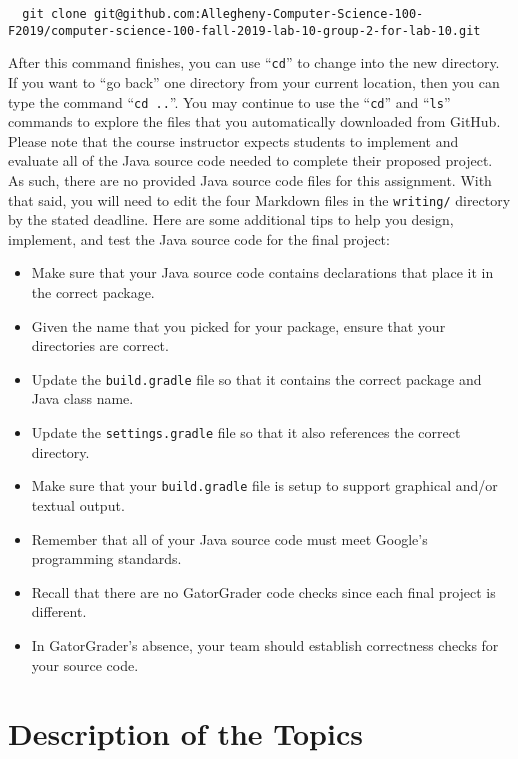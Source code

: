 \documentclass[11pt]{article}
\newcommand{\command}[1]{``\lstinline{#1}''}
\newcommand{\program}[1]{\lstinline{#1}}
\newcommand{\step}[1]{``{#1}''}
\begin{document}
\begin{lstlisting}
  git clone git@github.com:Allegheny-Computer-Science-100-F2019/computer-science-100-fall-2019-lab-10-group-2-for-lab-10.git
\end{lstlisting}

After this command finishes, you can use \command{cd} to change into the new
directory. If you want to \step{go back} one directory from your current
location, then you can type the command \command{cd ..}. You may continue to use
the \command{cd} and \command{ls} commands to explore the files that you
automatically downloaded from GitHub. Please note that the course instructor
expects students to implement and evaluate all of the Java source code needed to
complete their proposed project. As such, there are no provided Java source code
files for this assignment. With that said, you will need to edit the four
Markdown files in the \program{writing/} directory by the stated deadline. Here
are some additional tips to help you design, implement, and test the Java source
code for the final project:

\begin{itemize}
  \item Make sure that your Java source code contains declarations that place it in the correct package.
  \item Given the name that you picked for your package, ensure that your directories are correct.
  \item Update the \program{build.gradle} file so that it contains the correct package and Java class name.
  \item Update the \program{settings.gradle} file so that it also references the correct directory.
  \item Make sure that your \program{build.gradle} file is setup to support graphical and/or textual output.
  \item Remember that all of your Java source code must meet Google's programming standards.
  \item Recall that there are no GatorGrader code checks since each final project is different.
  \item In GatorGrader's absence, your team should establish correctness checks for your source code.
\end{itemize}

\section*{Description of the Topics}
\end{document}
